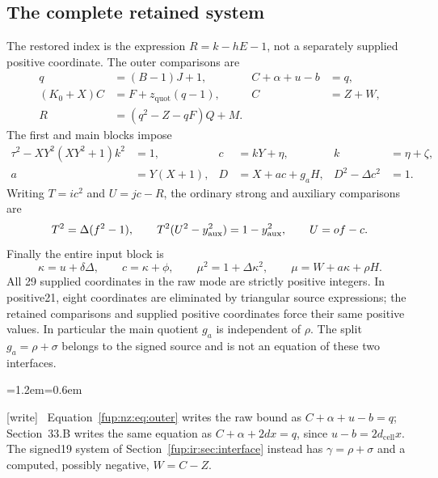 \documentclass[11pt,letterpaper]{article}
\theoremstyle{definition}\newtheorem{definition}[theorem]{Definition}
\theoremstyle{remark}\newtheorem{remark}[theorem]{Remark}
\newcommand{\dcell}{d_{\mathrm{cell}}}
\newcommand{\zquot}{z_{\mathrm{quot}}}\newcommand{\ga}{g_a}
\newcommand{\wtag}{\textup{[write]}}
\newenvironment{writenote}{\par\smallskip\begin{list}{}{\leftmargin=1.2em\rightmargin=0.6em}\item[]\small\wtag\ }{\end{list}\smallskip}
\begin{document}
\subsection{The complete retained system}
The restored index is the expression $R=k-hE-1$, not a separately supplied positive coordinate. The outer comparisons are
\begin{align}\label{fup:nz:eq:outer}
 q&=(B-1)J+1,& C+\alpha+u-b&=q,\\
 (K_0+X)C&=F+\zquot(q-1),&C&=Z+W,\\
 R&=(q^2-Z-qF)Q+M.&&\nonumber
\end{align}
The first and main blocks impose
\begin{align}\label{fup:nz:eq:firstmain}
 \tau^2-XY^2(XY^2+1)k^2&=1,&c&=kY+\eta,&k&=\eta+\zeta,\\
 a&=Y(X+1),&D&=X+ac+\ga H,&D^2-\Delta c^2&=1.\nonumber
\end{align}
Writing $T=ic^2$ and $U=jc-R$, the ordinary strong and auxiliary comparisons are
\begin{equation}\label{fup:nz:eq:auxsystem}
 T^2=\Delta(f^2-1),\qquad
 T^2(U^2-y_{\mathrm{aux}}^2)=1-y_{\mathrm{aux}}^2,\qquad U=of-c.
\end{equation}
Finally the entire input block is
\begin{equation}\label{fup:nz:eq:inputsystem}
 \kappa=u+\delta\Delta,\qquad c=\kappa+\phi,\qquad
 \mu^2=1+\Delta\kappa^2,\qquad
 \mu=W+a\kappa+\rho H.
\end{equation}
All 29 supplied coordinates in the raw mode are strictly positive integers. In positive21, eight coordinates are eliminated by triangular source expressions; the retained comparisons and supplied positive coordinates force their same positive values. In particular the main quotient $\ga$ is independent of $\rho$. The split $\ga=\rho+\sigma$ belongs to the signed source and is not an equation of these two interfaces.
\begin{writenote}
Equation~\eqref{fup:nz:eq:outer} writes the raw bound as $C+\alpha+u-b=q$; Section~33.B writes the same equation as $C+\alpha+2dx=q$, since $u-b=2\dcell x$. The signed19 system of Section~\ref{fup:ir:sec:interface} instead has $\gamma=\rho+\sigma$ and a computed, possibly negative, $W=C-Z$.
\end{writenote}
\end{document}
